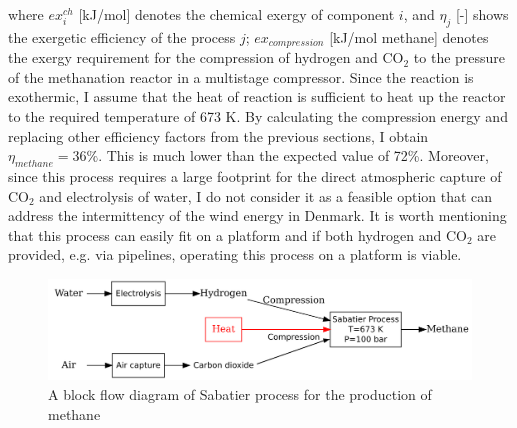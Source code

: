 \documentclass{ECOS_2021}
\begin{document}
where $ex_{i}^{ch}$ {[}kJ/mol{]} denotes the chemical exergy of component
$i$, and $\eta_{j}$ {[}-{]} shows the exergetic efficiency \cite{eftekhariExergyAnalysisUnderground2012f}
of the process $j$; $ex_{compression}$ {[}kJ/mol methane{]} denotes
the exergy requirement for the compression of hydrogen and CO$_{2}$
to the pressure of the methanation reactor in a multistage compressor.
Since the reaction is exothermic, I assume that the heat of reaction
is sufficient to heat up the reactor to the required temperature of
673 K. By calculating the compression energy and replacing other efficiency
factors from the previous sections, I obtain $\eta_{methane}=36\%$.
This is much lower than the expected value of 72\%. Moreover, since
this process requires a large footprint for the direct atmospheric
capture of CO$_{2}$ and electrolysis of water, I do not consider
it as a feasible option that can address the intermittency of the
wind energy in Denmark. It is worth mentioning that this process can
easily fit on a platform and if both hydrogen and CO$_{2}$ are provided,
e.g. via pipelines, operating this process on a platform is viable.

\begin{figure}[H]
\centering
\includegraphics[width=12cm]{sabatier}

\caption{\label{fig:methane-process}A block flow diagram of Sabatier process
for the production of methane \cite{eftekhariQuantifyingRoleLiquid2020}}
\end{figure}
\end{document}
